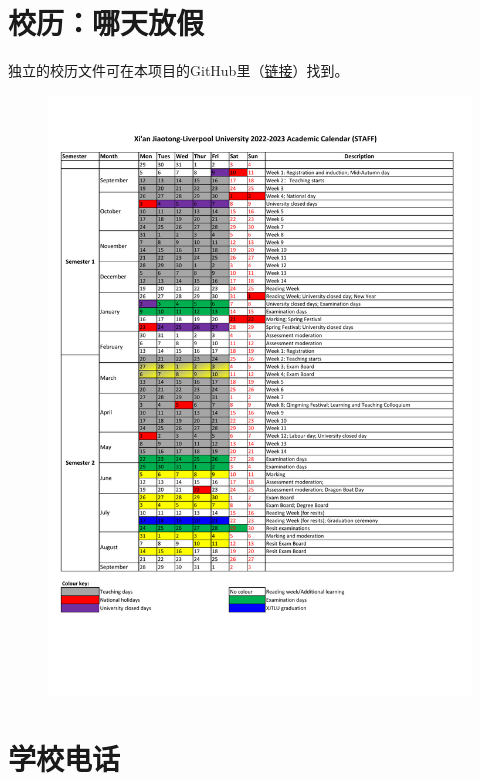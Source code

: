 \section{校历：哪天放假}
独立的校历文件可在本项目的GitHub里（\href{https://github.com/kaiwu-astro/xp_pgrs_unofficial_guide/raw/main/author-folder/Kai.Wu/Academic_Calendar-202223.pdf}{链接}）找到。
\begin{figure}[H]
    \includegraphics[width=0.9\columnwidth]{author-folder/Kai.Wu/Academic_Calendar-202223.pdf}
\end{figure}

\section{学校电话}

